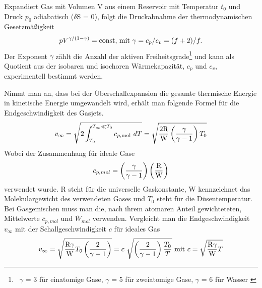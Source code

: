 %
Expandiert Gas mit Volumen V aus einem Reservoir mit Temperatur $t_0$ und Druck $p_0$ adiabatisch ($\delta$S = 0), folgt die Druckabnahme der thermodynamischen Gesetzmäßigkeit
\begin{equation}
pV^{\gamma/(1-\gamma)} = \textmd{const, mit}\ \gamma=c_p/c_v=(f+2)/f .
\end{equation}
%
Der Exponent $\gamma$ zählt die Anzahl der aktiven Freiheitsgrade\footnote{\ $\gamma$ = 3 für einatomige Gase, $\gamma$ = 5 für zweiatomige Gase, $\gamma$ = 6 für Wasser \cite{mul13}} und kann als Quotient aus der isobaren und isochoren Wärmekapazität, $c_p$ und $c_v$, experimentell bestimmt werden. 

Nimmt man an, dass bei der Überschallexpansion die gesamte thermische Energie in kinetische Energie umgewandelt wird, erhält man folgende Formel für die Endgeschwindigkeit des Gasjets.
\begin{equation}
v_\infty=\sqrt{2\int_{T_0}^{T_\infty \ll T_0} c_{p,{\tiny \textmd{mol}}}\ dT}= \sqrt{\frac{2\textmd{R}}{\textmd{W}}\left(\frac{\gamma}{\gamma-1}\right)T_0}
\end{equation}
%
Wobei der Zusammenhang für ideale Gase
\begin{equation}
c_{p,mol}= \left(\frac{\gamma}{\gamma-1}\right)\left(\frac{\textmd{R}}{\textmd{W}}\right)
\end{equation}
%
verwendet wurde. R steht für die universelle Gaskonstante, W kennzeichnet das Molekulargewicht des verwendeten Gases und $T_0$ steht für die Düsentemperatur.
Bei Gasgemischen muss man die, nach ihrem atomaren Anteil gewichteteten, Mittelwerte $\bar{c}_{p,mol}$ und $\bar{W}_{mol}$ verwenden.
Vergleicht man die Endgeschwindigkeit $v_{\infty}$ mit der Schallgeschwindigkeit $c$ für ideales Gas
\begin{equation}
v_\infty= \sqrt{\frac{\textmd{R}\gamma}{\textmd{W}}T_0\left(\frac{2}{\gamma-1}\right)} = c\ \sqrt{\left(\frac{2}{\gamma-1}\right)\frac{T_0}{T}} \textmd{ mit } c=\sqrt{\frac{\textmd{R} \gamma}{\textmd{W}}T}
\end{equation}

